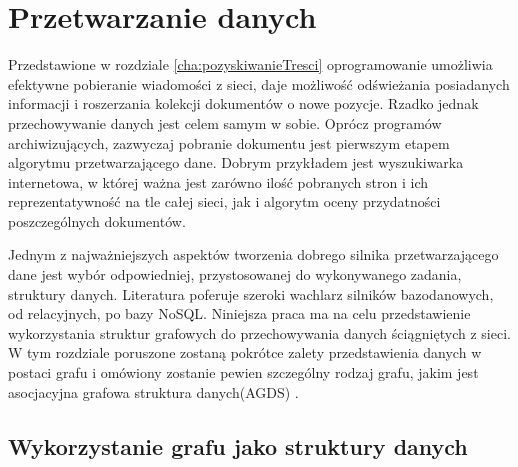 \chapter{Przetwarzanie danych}
\label{cha:budowaGrafu}

Przedstawione w rozdziale \ref{cha:pozyskiwanieTresci} oprogramowanie umożliwia efektywne pobieranie wiadomości z sieci, daje możliwość odświeżania posiadanych informacji
i roszerzania kolekcji dokumentów o nowe pozycje. Rzadko jednak przechowywanie danych jest celem samym w sobie. Oprócz programów archiwizujących, zazwyczaj pobranie dokumentu jest pierwszym
etapem algorytmu przetwarzającego dane. Dobrym przykładem jest wyszukiwarka internetowa, w której ważna jest zarówno ilość pobranych stron i ich reprezentatywność na tle całej sieci, jak
i algorytm oceny przydatności poszczególnych dokumentów.

Jednym z najważniejszych aspektów tworzenia dobrego silnika przetwarzającego dane jest wybór odpowiedniej, przystosowanej do
wykonywanego zadania, struktury danych. Literatura poferuje szeroki wachlarz silników bazodanowych, od relacyjnych, po bazy NoSQL. Niniejsza praca ma na celu przedstawienie wykorzystania
struktur grafowych do przechowywania danych ściągniętych z sieci. W tym rozdziale poruszone zostaną pokrótce zalety przedstawienia danych w postaci grafu i omówiony zostanie pewien 
szczególny rodzaj grafu, jakim jest asocjacyjna grafowa struktura danych(AGDS) \cite[s. 108]{Horzyk}. 

\section{Wykorzystanie grafu jako struktury danych}
\label{section:graf}

 
